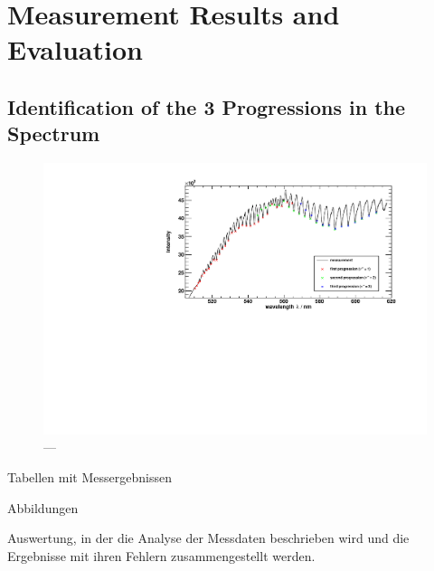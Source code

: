 \section{Measurement Results and Evaluation}

\subsection{Identification of the 3 Progressions in the Spectrum}

\begin{figure}[H]
\begin{center}
  \includegraphics[width=\textwidth]{../img/I2_absorption.pdf}
  \caption[Zählrohrcharakteristik mit \uran]{---}
  \label{img:char:uran}
\end{center}
\end{figure}



Tabellen mit Messergebnissen

Abbildungen

Auswertung, in der die Analyse der Messdaten beschrieben wird und die Ergebnisse mit ihren Fehlern zusammengestellt werden.